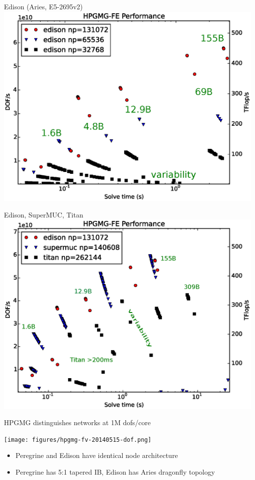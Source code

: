 \documentclass{beamer}
\begin{document}
\begin{frame}{Edison (Aries, E5-2695v2)}
  \includegraphics[width=\textwidth]{figures/hpgmg/range-edison-ann.eps}
\end{frame}

\begin{frame}{Edison, SuperMUC, Titan}
  \includegraphics[width=\textwidth]{figures/hpgmg/range-edison-supermuc-titan-ann.eps}
\end{frame}

\begin{frame}{HPGMG distinguishes networks at 1M dofs/core}
  \begin{center}
    \texttt{[image: figures/hpgmg-fv-20140515-dof.png]}
  \end{center}
  \begin{itemize}
  \item Peregrine and Edison have identical node architecture
  \item Peregrine has 5:1 tapered IB, Edison has Aries dragonfly topology
  \end{itemize}
\end{frame}
\end{document}

